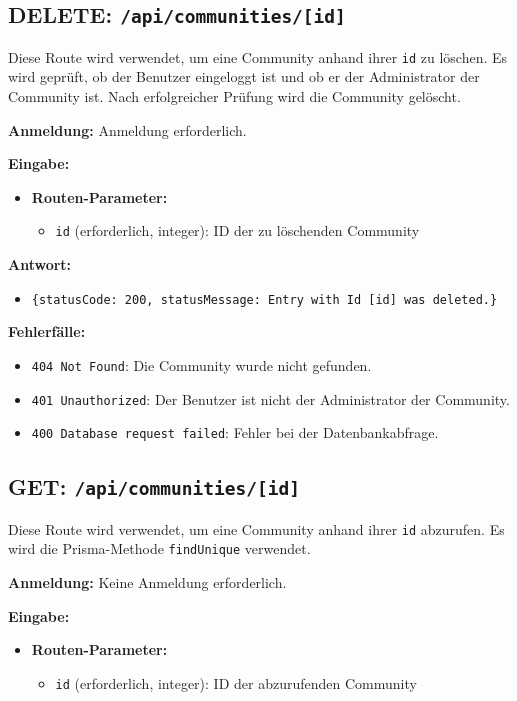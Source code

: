 \documentclass[a4paper,12pt]{article}
\begin{document}
\newpage
\subsection{DELETE: \texttt{/api/communities/[id]}}

Diese Route wird verwendet, um eine Community anhand ihrer \texttt{id} zu
löschen. Es wird geprüft, ob der Benutzer eingeloggt ist und ob er der
Administrator der Community ist. Nach erfolgreicher Prüfung wird die Community
gelöscht.

\textbf{Anmeldung:} Anmeldung erforderlich.

\textbf{Eingabe:}
\begin{itemize}
    \item \textbf{Routen-Parameter:}
    \begin{itemize}
        \item \texttt{id} (erforderlich, integer):
            ID der zu löschenden Community
    \end{itemize}
\end{itemize}

\textbf{Antwort:}
\begin{itemize}
    \item \texttt{\{statusCode: 200,
        statusMessage: Entry with Id [id] was deleted.\}}
\end{itemize}

\textbf{Fehlerfälle:}
\begin{itemize}
    \item \texttt{404 Not Found}:
        Die Community wurde nicht gefunden.
    \item \texttt{401 Unauthorized}:
        Der Benutzer ist nicht der Administrator der Community.
    \item \texttt{400 Database request failed}:
        Fehler bei der Datenbankabfrage.
\end{itemize}

\newpage
\subsection{GET: \texttt{/api/communities/[id]}}

Diese Route wird verwendet, um eine Community anhand ihrer \texttt{id}
abzurufen. Es wird die Prisma-Methode \texttt{findUnique} verwendet.

\textbf{Anmeldung:} Keine Anmeldung erforderlich.

\textbf{Eingabe:}
\begin{itemize}
    \item \textbf{Routen-Parameter:}
    \begin{itemize}
        \item \texttt{id} (erforderlich, integer):
            ID der abzurufenden Community
    \end{itemize}
\end{itemize}
\end{document}
